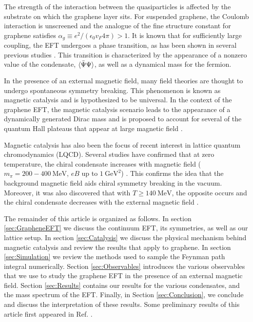 \documentclass[aps,prd,twocolumn,showpacs,superscriptaddress,groupedaddress]{revtex4}  %
\begin{document}
The strength of the interaction between the quasiparticles is affected by the substrate on which the graphene layer sits. For suspended graphene, the Coulomb interaction is unscreened
and the analogue of the fine structure constant for graphene satisfies $\alpha_g \equiv e^2/(\epsilon_0 v_F 4\pi) > 1$. It is known that for sufficiently large coupling, the EFT undergoes a phase transition, as has been shown in 
several previous studies \cite{Drut1, Drut2, Hands1, Hands2}. This transition is characterized by the appearance of a nonzero value of the condensate, ${\langle {\bar \Psi} \Psi \rangle}$, as well as a dynamical mass
for the fermion.

In the presence of an external magnetic field, many field theories are thought to undergo spontaneous symmetry breaking. This phenomenon is known as magnetic catalysis and is hypothesized to be universal. In the context of the graphene EFT, the magnetic
catalysis scenario leads to the appearance of a dynamically generated Dirac mass and is proposed to account for several of the quantum Hall plateaus that appear at large magnetic field \cite{ZhangQHE,JiangQHE}.

Magnetic catalysis has also been the focus of recent interest in lattice quantum chromodynamics (LQCD). Several studies have confirmed that at zero temperature, the chiral condensate
increases with magnetic field ($m_{\pi} = 200-400 ~\text{MeV}$, $eB$ up to $1 ~\text{GeV}^2$) \cite{Buividovich,Braguta}. This confirms the idea that the background magnetic field aids chiral symmetry breaking in the vacuum.
Moreover, it was also discovered that with $T \geq 140 ~\text{MeV}$, the opposite occurs and the chiral condensate decreases with the external magnetic field \cite{Bali1,Bali2}.

The remainder of this article is organized as follows. In section \ref{sec:GrapheneEFT} we discuss the continuum EFT, its symmetries, as well as our lattice setup.
In section \ref{sec:Catalysis} we discuss the physical mechanism behind magnetic catalysis and review the results that apply to graphene. In section \ref{sec:Simulation} we review the methods used to sample the Feynman path integral numerically. Section \ref{sec:Observables} introduces the various observables that we use to study the graphene EFT in the presence of an external magnetic field. Section \ref{sec:Results} contains our results for the various condensates, and the mass spectrum of the EFT.
Finally, in Section \ref{sec:Conclusion}, we conclude and discuss the interpretation of these results. Some preliminary results of this article first appeared in Ref. \cite{DPF2015}.
\end{document}

